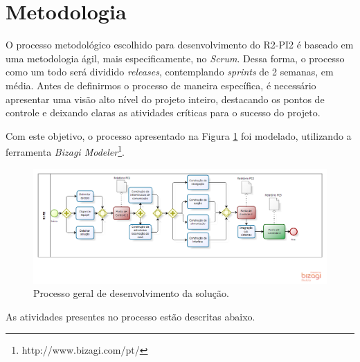\section{Metodologia}
	
	O processo metodológico escolhido para desenvolvimento do R2-PI2 é baseado em uma metodologia ágil, mais especificamente, no \textit{Scrum}. Dessa forma, o processo como um todo será dividido \textit{releases}, contemplando \textit{sprints} de 2 semanas, em média. Antes de definirmos o processo de maneira específica, é necessário apresentar uma visão alto nível do projeto inteiro, destacando os pontos de controle e deixando claras as atividades críticas para o sucesso do projeto.

	Com este objetivo, o processo apresentado na Figura \ref{img:processo_geral} foi modelado, utilizando a ferramenta \textit{Bizagi Modeler}\footnote{http://www.bizagi.com/pt/}.

	\begin{figure}[H]
		\centering
		\includegraphics[scale=0.55]{figuras/processo_geral.png}
		\caption{Processo geral de desenvolvimento da solução.}
		\label{img:processo_geral}
	\end{figure}

	As atividades presentes no processo estão descritas abaixo.

